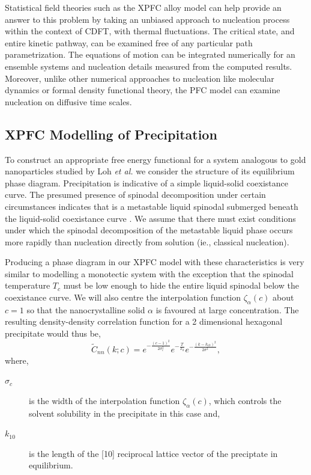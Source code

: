 \documentclass[showkeys, prb, reprint]{revtex4-1}
\newcommand{\f}{\frac}          %
\begin{document}
Statistical field theories such as the XPFC alloy model can help provide an 
answer to this problem by taking an unbiased approach to nucleation process
within the context of CDFT{\color{red}, with thermal fluctuations}.  The critical state, and entire kinetic pathway,
can be examined free of any particular {\color{red} path} parametrization. The equations of motion
can be integrated numerically for an ensemble systems and nucleation details
measured from the computed results.  Moreover, unlike other numerical
approaches to nucleation like molecular dynamics or formal density functional
theory, the PFC model can examine nucleation on diffusive time scales.

\subsection{XPFC Modelling of Precipitation} %


To construct an appropriate free energy functional for a system analogous to
gold nanoparticles studied by Loh \textit{et al.} \cite{LOH17} we consider the
structure of its equilibrium phase diagram. Precipitation is indicative of a
simple liquid-solid coexistance curve. The presumed presence of spinodal
decomposition under certain circumstances indicates that is a metastable liquid
spinodal submerged beneath the liquid-solid coexistance curve \cite{DAVEY13}.
We assume that there must exist conditions under which the spinodal
decomposition of the metastable liquid phase occurs more rapidly than
nucleation directly from solution (ie., classical nucleation).


Producing a phase diagram in our XPFC model with these characteristics is very
similar to modelling a monotectic system with the exception that the spinodal
temperature $T_c$ must be low enough to hide the entire liquid spinodal below
the coexistance curve.  We will also centre the interpolation function
$\zeta_\alpha(c)$ about $c = 1$ so that the nanocrystalline solid $\alpha$ is
favoured at large concentration. The resulting density-density correlation
function for a 2 dimensional hexagonal precipitate would thus be,
%
\begin{equation}
    \label{eq:precip_corr}
    \tilde{C}_{nn}(k; c) = e^{- \f{(c - 1)^2}{2\sigma_c^2}}
        e^{-\f{T}{T_0}}
        e^{- \f{(k - k_{10})^2}{2\sigma^2}},
\end{equation}
%
where,
\begin{description}
    \item[$\sigma_c$] is the width of the interpolation function
        $\zeta_\alpha(c)$, which controls the solvent solubility in the
        precipitate in this case and,
    \item[$k_{10}$] is the length of the [10] reciprocal lattice vector of the
        preciptate in equilibrium.
\end{description}
\end{document}
